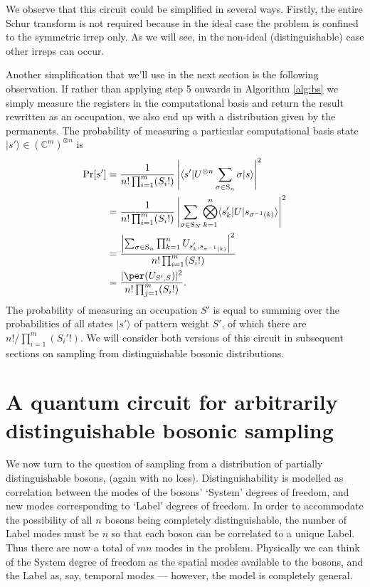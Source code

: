 We observe that this circuit could be simplified in several ways.
Firstly, the entire Schur transform is not required because in the ideal case the problem is confined to the symmetric irrep only.
As we will see, in the non-ideal (distinguishable) case other irreps can occur.

Another simplification that we'll use in the next section is the following observation.
If rather than applying step 5 onwards in Algorithm \ref{alg:bs} we simply measure the registers in the computational basis and return the result rewritten as an occupation, we also end up with a distribution given by the permanents. 
The probability of measuring a particular computational basis state $|s'\rangle \in (\mathbb{C}^m)^{\otimes n}$ is
\begin{align}
\textrm{Pr}[s'] 
&= \frac{1}{n!\prod_{i=1}^m (S_i!)}\left|\langle s'|U^{\otimes n}\sum_{\sigma \in \textrm{S}_n}\sigma|s\rangle\right|^2\\
&= \frac{1}{n!\prod_{i=1}^m (S_i!)}\left|\sum_{\sigma \in \textrm{S}_N}\bigotimes_{k = 1}^n\langle s_k'|U|s_{\sigma^{-1}(k)}\rangle\right|^2\\
&= \frac{\left|\sum_{\sigma \in \textrm{S}_n}\prod_{k = 1}^n U_{s_k', s_{\sigma^{-1}(k)}}\right|^2}{n!\prod_{i=1}^m (S_i!)} \\
&= \frac{|\per(U_{S',S})|^2}{n!\prod_{j=1}^m (S_i!)}.
\end{align}
The probability of measuring an occupation $S'$ is equal to summing over the probabilities of all states $|s'\rangle$ of pattern weight $S'$, of which there are $n!/\prod_{i=1}^m (S_i'!)$.
We will consider both versions of this circuit in subsequent sections on sampling from distinguishable bosonic distributions.

\section{A quantum circuit for arbitrarily distinguishable bosonic sampling}
\label{sec:qc-noisy}

We now turn to the question of sampling from a distribution of partially distinguishable bosons, (again with no loss).
Distinguishability is modelled as correlation between the modes of the bosons' `System'  degrees of freedom, and new modes corresponding to `Label' degrees of freedom.
In order to accommodate the possibility of all $n$ bosons being completely distinguishable, the number of Label modes must be $n$ so that each boson can be correlated to a unique Label.
Thus there are now a total of $mn$ modes in the problem.
Physically we can think of the System degree of freedom as the spatial modes available to the bosons, and the Label as, say, temporal modes --- however, the model is completely general.

